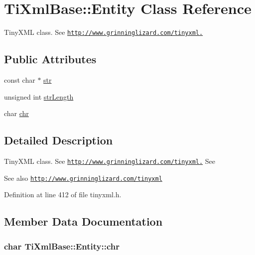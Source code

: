 \hypertarget{struct_ti_xml_base_1_1_entity}{
\section{TiXmlBase::Entity Class Reference}
\label{struct_ti_xml_base_1_1_entity}
}


TinyXML class. See \href{http://www.grinninglizard.com/tinyxml.}{\tt http://www.grinninglizard.com/tinyxml.}  
\subsection*{Public Attributes}
\begin{DoxyCompactItemize}
\item 
const char $\ast$ \hyperlink{struct_ti_xml_base_1_1_entity_ab721b5d4f7ed144ffd215947b38258b7}{str}
\item 
unsigned int \hyperlink{struct_ti_xml_base_1_1_entity_a22e8d820894d3360b01fed110badb876}{strLength}
\item 
char \hyperlink{struct_ti_xml_base_1_1_entity_a2a7e1e68b93b4f76255c60c8fa7f738e}{chr}
\end{DoxyCompactItemize}


\subsection{Detailed Description}
TinyXML class. See \href{http://www.grinninglizard.com/tinyxml.}{\tt http://www.grinninglizard.com/tinyxml.} See \begin{DoxySeeAlso}{See also}
\href{http://www.grinninglizard.com/tinyxml}{\tt http://www.grinninglizard.com/tinyxml} 
\end{DoxySeeAlso}


Definition at line 412 of file tinyxml.h.

\subsection{Member Data Documentation}
\hypertarget{struct_ti_xml_base_1_1_entity_a2a7e1e68b93b4f76255c60c8fa7f738e}{
\subsubsection[{chr}]{\setlength{\rightskip}{0pt plus 5cm}char {\bf TiXmlBase::Entity::chr}}}
\label{struct_ti_xml_base_1_1_entity_a2a7e1e68b93b4f76255c60c8fa7f738e}


